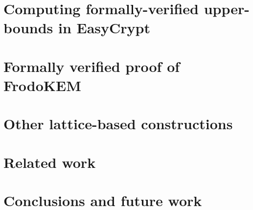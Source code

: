 \documentclass[conference,compsoc]{IEEEtran}
\begin{document}
\section{Computing formally-verified upper-bounds in EasyCrypt}

\section{Formally verified proof of FrodoKEM}

\section{Other lattice-based constructions}

\section{Related work}

\section{Conclusions and future work}



\end{document}
